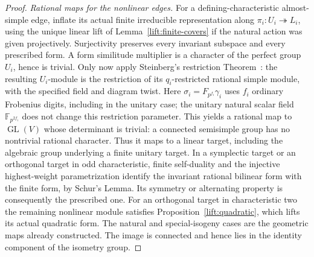 \begin{proof}
\smallskip\noindent
\emph{Rational maps for the nonlinear edges.}
For a defining-characteristic almost-simple edge, inflate its actual
finite irreducible representation along $\pi_i:U_i\twoheadrightarrow L_i$,
using the unique linear lift of Lemma~\ref{lift:finite-covers}
if the natural action was given
projectively.  Surjectivity preserves every invariant subspace and
every prescribed form.  A form similitude multiplier is a character
of the perfect group $U_i$, hence is trivial.
Only now apply Steinberg's restriction
Theorem~\cite[Theorem~43]{SteinbergNotes}: the resulting $U_i$-module
is the restriction of its $q_i$-restricted rational simple module,
with the specified field and diagram twist.  Here
$\sigma_i=F_{p^{f_i}}\gamma_i$ uses $f_i$ ordinary Frobenius digits,
including in the unitary case; the unitary natural scalar field
$\mathbb F_{p^{2f_i}}$ does not change this restriction parameter.
This yields a rational map to
$\operatorname{GL}(V)$ whose determinant is trivial: a connected
semisimple group has no nontrivial rational character.  Thus it maps
to a linear target, including the algebraic group underlying a
finite unitary target.  In a symplectic target or an orthogonal target
in odd characteristic, finite self-duality and the injective
highest-weight parametrization identify the invariant rational
bilinear form with the finite form, by Schur's Lemma.  Its symmetry
or alternating property is consequently the prescribed one.
For an orthogonal target in characteristic two the remaining
nonlinear module satisfies Proposition~\ref{lift:quadratic}, which
lifts its actual quadratic form.  The natural and special-isogeny
cases are the geometric maps already constructed.  The image is
connected and hence lies in the identity component of the isometry
group.


\end{proof}
